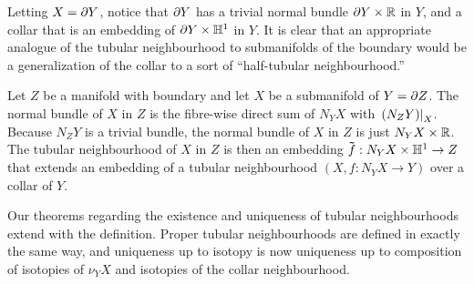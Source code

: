 Letting $X=\partial Y$, notice that $\partial Y$ has a trivial normal bundle $\partial Y\times \mathbb{R}$ in $Y$, and a collar that is an embedding of $\partial Y\times\mathbb{H}^1$ in $Y$.
It is clear that an appropriate analogue of the tubular neighbourhood to submanifolds of the boundary would be a generalization of the collar to a sort of ``half-tubular neighbourhood.''

\begin{defn}
	Let $Z$ be a manifold with boundary and let $X$ be a submanifold of $Y=\partial Z$.
	The normal bundle of $X$ in $Z$ is the fibre-wise direct sum of $N_Y X$ with $\left.(N_Z Y)\right|_{X}$.
	Because $N_Z Y$ is a trivial bundle, the normal bundle of $X$ in $Z$ is just $N_Y X\times \mathbb{R}$.
	The tubular neighbourhood of $X$ in $Z$ is then an embedding $\mathbf{\tilde{\text{$f$}}}:N_Y X\times \mathbb{H}^1\to Z$ that extends an embedding of a tubular neighbourhood $(X,f:N_Y X\to Y)$ over a collar of $Y$.
\end{defn}

Our theorems regarding the existence and uniqueness of tubular neighbourhoods extend with the definition.
Proper tubular neighbourhoods are defined in exactly the same way, and uniqueness up to isotopy is now uniqueness up to composition of isotopies of $\nu_Y X$ and isotopies of the collar neighbourhood.